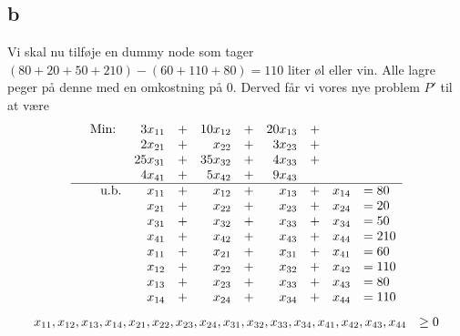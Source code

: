 \documentclass[a4paper]{article}
\begin{document}
\subsection*{b}
Vi skal nu tilføje en dummy node som tager $(80+20+50+210)-(60+110+80)=110$ liter øl eller vin. Alle lagre peger på denne med en omkostning på $0$. Derved får vi vores nye problem $P'$ til at være
\begin{equation}
\begin{array}{rrrrrrrrrl}
&\text{Min: } & 3x_{11} & + & 10x_{12} & + & 20x_{13} & + && \\
& &2x_{21} & + & x_{22} & + & 3x_{23} & + &&\\
& &25x_{31} & + & 35x_{32} & + & 4x_{33} & + &&\\
& &4x_{41} & + & 5x_{42} & + & 9x_{43} & &&\\
\hline
&\text{u.b.} & x_{11} & + & x_{12} & +  & x_{13} & + & x_{14}& = 80 \\
& & x_{21} & + & x_{22} & +  & x_{23} & + & x_{24} & = 20 \\
& & x_{31} & + & x_{32} & +  & x_{33} & + & x_{34} & = 50 \\
& & x_{41} & + & x_{42} & +  & x_{43} & + & x_{44} & = 210 \\
& & x_{11} & + & x_{21} & +  & x_{31} & + & x_{41} & = 60 \\
& & x_{12} & + & x_{22} & +  & x_{32} & + & x_{42} & = 110 \\
& & x_{13} & + & x_{23} & +  & x_{33} & + & x_{43} & = 80 \\
& & x_{14} & + & x_{24} & +  & x_{34} & + & x_{44} & = 110 \\
\end{array}
\end{equation}
\begin{equation}
\begin{array}{rrrrrrrrrl}
\multicolumn{9}{r} {x_{11},x_{12},x_{13},x_{14},x_{21},x_{22},x_{23},x_{24},x_{31},x_{32},x_{33}, x_{34},x_{41},x_{42}, x_{43}, x_{44}} & \geq 0
\end{array}
\end{equation}
\end{document}
